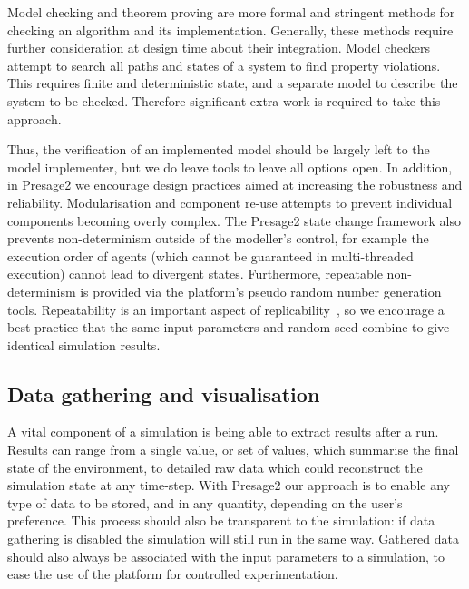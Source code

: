 Model checking and theorem proving are more formal and stringent methods for
checking an algorithm and its implementation. Generally, these methods require
further consideration at design time about their integration. Model
checkers attempt to search all paths and states of a system to find property
violations. This requires finite and deterministic state, and a separate model
to describe the system to be checked. Therefore significant extra work is
required to take this approach.

Thus, the verification of an implemented model should be largely left to the
model implementer, but we do leave tools to leave all options open. In
addition, in Presage2 we encourage design practices aimed at increasing the
robustness and reliability. Modularisation and component re-use attempts to
prevent individual components becoming overly complex. The Presage2 state
change framework also prevents non-determinism outside of the modeller's
control, for example the execution order of agents (which cannot be guaranteed
in multi-threaded execution) cannot lead to divergent states. Furthermore,
repeatable non- determinism is provided via the platform's pseudo random
number generation tools. Repeatability is an important aspect of
replicability~\citep{Axelrod1997,Ormerod2009}, so we encourage a best-practice
that the same input parameters and random seed combine to give identical
simulation results.


\subsection{Data gathering and visualisation}

A vital component of a simulation is being able to extract results after a run.
Results can range from a single value, or set of values, which summarise the final
state of the environment, to detailed raw data which could reconstruct the
simulation state at any time-step. With Presage2 our approach is to enable any
type of data to be stored, and in any quantity, depending on the user's
preference. This process should also be transparent to the simulation: if data
gathering is disabled the simulation will still run in the same way. Gathered
data should also always be associated with the input parameters to a simulation,
to ease the use of the platform for controlled experimentation.


